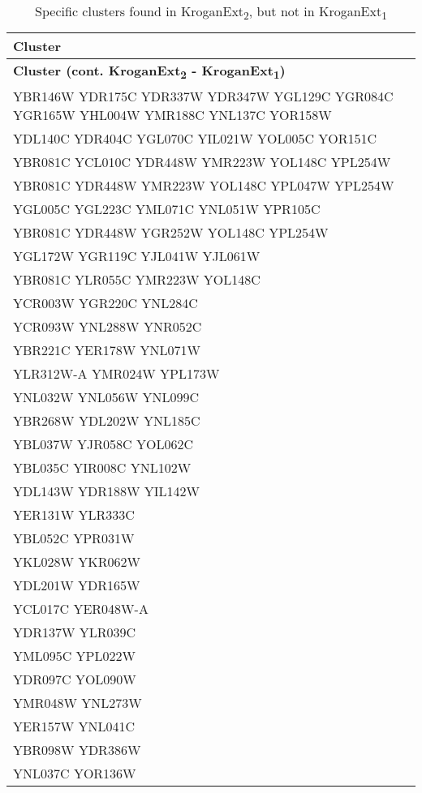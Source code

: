 \setlength{\extrarowheight}{2pt}
\renewcommand{\arraystretch}{1.2}
\begin{longtable}{| m{27em} |}
\caption{Specific clusters found in KroganExt\textsubscript{2}, but not in KroganExt\textsubscript{1}} \\
\hline
\textbf{Cluster} \\
\hline
\endfirsthead
\hline
\textbf{Cluster (cont. KroganExt\textsubscript{2} - KroganExt\textsubscript{1})} \\
\hline
\endhead
\hline
\endfoot
\hline
\endlastfoot
YBR146W YDR175C YDR337W YDR347W YGL129C YGR084C YGR165W YHL004W YMR188C YNL137C YOR158W \\
\hline
YDL140C YDR404C YGL070C YIL021W YOL005C YOR151C \\
\hline
YBR081C YCL010C YDR448W YMR223W YOL148C YPL254W \\
\hline
YBR081C YDR448W YMR223W YOL148C YPL047W YPL254W \\
\hline
YGL005C YGL223C YML071C YNL051W YPR105C \\
\hline
YBR081C YDR448W YGR252W YOL148C YPL254W \\
\hline
YGL172W YGR119C YJL041W YJL061W \\
\hline
YBR081C YLR055C YMR223W YOL148C \\
\hline
YCR003W YGR220C YNL284C \\
\hline
YCR093W YNL288W YNR052C \\
\hline
YBR221C YER178W YNL071W \\
\hline
YLR312W-A YMR024W YPL173W \\
\hline
YNL032W YNL056W YNL099C \\
\hline
YBR268W YDL202W YNL185C \\
\hline
YBL037W YJR058C YOL062C \\
\hline
YBL035C YIR008C YNL102W \\
\hline
YDL143W YDR188W YIL142W \\
\hline
YER131W YLR333C \\
\hline
YBL052C YPR031W \\
\hline
YKL028W YKR062W \\
\hline
YDL201W YDR165W \\
\hline
YCL017C YER048W-A \\
\hline
YDR137W YLR039C \\
\hline
YML095C YPL022W \\
\hline
YDR097C YOL090W \\
\hline
YMR048W YNL273W \\
\hline
YER157W YNL041C \\
\hline
YBR098W YDR386W \\
\hline
YNL037C YOR136W \\
\hline
\end{longtable}